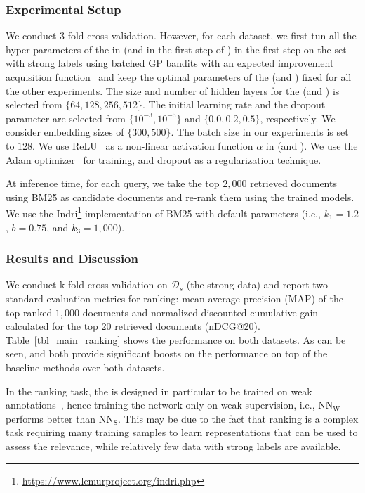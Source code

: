 \subsubsection{Experimental Setup}
We conduct 3-fold cross-validation. However, for each dataset, we first tun all the hyper-parameters of the \tnet in \cws (and \std in the first step of \fwl) in the first step on the set with strong labels using batched GP bandits with an expected improvement acquisition function~\citep{Desautels:2014} and keep the optimal parameters of the \tnet (and \std) fixed for all the other experiments.
The size and number of hidden layers for the \tnet (and \std) is selected from $\{64, 128, 256, 512\}$. The initial learning rate and the dropout parameter are selected from $\{10^{-3}, 10^{-5}\}$ and $\{0.0, 0.2, 0.5\}$, respectively. We consider embedding sizes of $\{300, 500\}$. The batch size in our experiments is set to $128$.  We use ReLU~\citep{Nair:2010} as a non-linear activation function $\alpha$ in \tnet (and \std).  We use the Adam optimizer~\citep{Kingma:2014} for training, and dropout as a regularization technique.

%
At inference time, for each query, we take the top $2,000$ retrieved documents using BM25 as candidate documents and re-rank them using the trained models. We use the Indri\footnote{\url{https://www.lemurproject.org/indri.php}} implementation of BM25 with default parameters (i.e., $k_1 = 1.2$, $b = 0.75$, and $k_3 = 1,000$).

\subsubsection{Results and Discussion} 
\label{sec:res_and_disc_ranking}
We conduct k-fold cross validation on $\mathcal{D}_s$ (the strong data) and report two standard evaluation metrics for ranking: mean average precision (MAP) of the top-ranked $1,000$ documents and normalized discounted cumulative gain calculated for the top $20$ retrieved documents (nDCG@20). 
Table~\ref{tbl_main_ranking} shows the performance on both datasets. As can be seen, \fwl and \cws both provide significant boosts on the performance on top of the baseline methods over both datasets.




In the ranking task, the \std is designed in particular to be trained on weak annotations~\citep{Dehghani:2017:SIGIR}, hence training the network only on weak supervision, i.e., $\text{NN}_{\text{W}}$ performs better than $\text{NN}_{\text{S}}$. This may be due to the fact that ranking is a complex task requiring many training samples to learn representations that can be used to assess the relevance, while relatively few data with strong labels are available.

